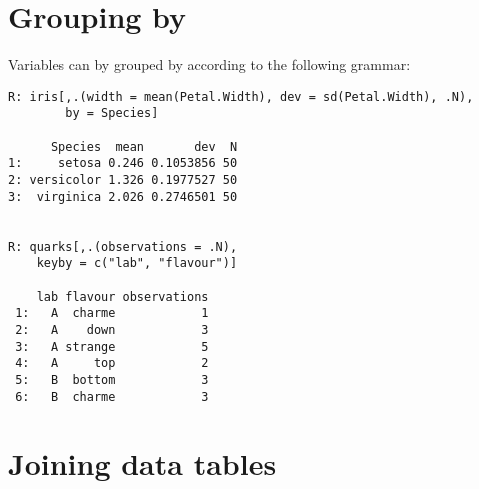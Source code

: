 \section{Grouping by}
Variables can by grouped by according to
the following grammar:
\begin{verbatim}
R: iris[,.(width = mean(Petal.Width), dev = sd(Petal.Width), .N), 
        by = Species]
        
      Species  mean       dev  N
1:     setosa 0.246 0.1053856 50
2: versicolor 1.326 0.1977527 50
3:  virginica 2.026 0.2746501 50


R: quarks[,.(observations = .N), 
	keyby = c("lab", "flavour")]

    lab flavour observations
 1:   A  charme            1
 2:   A    down            3
 3:   A strange            5
 4:   A     top            2
 5:   B  bottom            3
 6:   B  charme            3
\end{verbatim}

\section{Joining data tables}
